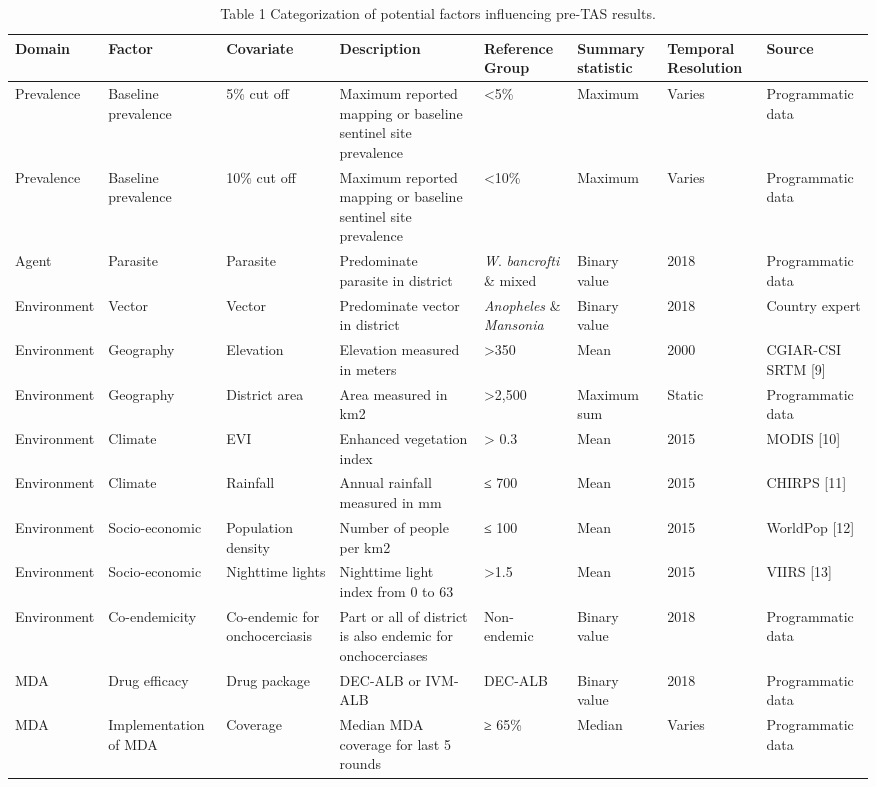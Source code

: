\documentclass[11pt,a4paper]{article}
\begin{document}
\begin{table}[h]
\caption{Table 1 Categorization of potential factors influencing pre-TAS results.}
\begin{tabular}{|l|l|l|l|l|l|l|l|}
\hline
Domain & Factor & Covariate & Description & Reference Group & Summary statistic & Temporal Resolution & Source \\ \hline
Prevalence & Baseline prevalence & 5\% cut off & Maximum reported mapping or baseline sentinel site prevalence & <5\% & Maximum & Varies & Programmatic data \\ \hline
Prevalence & Baseline prevalence & 10\% cut off & Maximum reported mapping or baseline sentinel site prevalence & <10\% & Maximum & Varies & Programmatic data \\ \hline
Agent & Parasite & Parasite & Predominate parasite in district & \textit{W}. \textit{bancrofti} \& mixed & Binary value & 2018 & Programmatic data \\ \hline
Environment & Vector & Vector & Predominate vector in district & \textit{Anopheles} \& \textit{Mansonia} & Binary value & 2018 & Country expert \\ \hline
Environment & Geography & Elevation & Elevation measured in meters & >350 & Mean & 2000 & CGIAR-CSI SRTM [9] \\ \hline
Environment & Geography & District area & Area measured in km2 & >2,500 & Maximum sum & Static & Programmatic data \\ \hline
Environment & Climate & EVI & Enhanced vegetation index & > 0.3 & Mean & 2015 & MODIS [10] \\ \hline
Environment & Climate & Rainfall & Annual rainfall measured in mm & ≤ 700 & Mean & 2015 & CHIRPS [11] \\ \hline
Environment & Socio-economic & Population density & Number of people per km2 & ≤ 100 & Mean & 2015 & WorldPop [12] \\ \hline
Environment & Socio-economic & Nighttime lights & Nighttime light index from 0 to 63 & >1.5 & Mean & 2015 & VIIRS [13] \\ \hline
Environment & Co-endemicity & Co-endemic for onchocerciasis & Part or all of district is also endemic for onchocerciases & Non-endemic & Binary value & 2018 & Programmatic data \\ \hline
MDA & Drug efficacy & Drug package & DEC-ALB or IVM-ALB & DEC-ALB & Binary value & 2018 & Programmatic data \\ \hline
MDA & Implementation of MDA & Coverage & Median MDA coverage for last 5 rounds & ≥ 65\% & Median & Varies & Programmatic data \\ \hline

\end{tabular}
\end{table}
\end{document}
